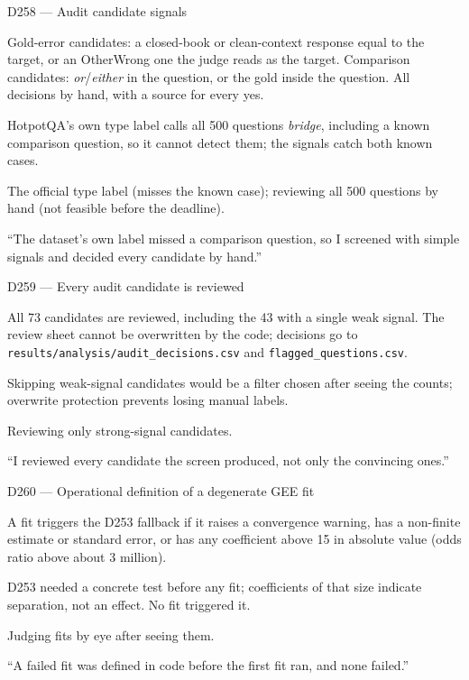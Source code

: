 \documentclass[11pt,a4paper]{report}
\begin{document}
\begin{decisionbox}{D258 --- Audit candidate signals}
\begin{description}[nosep, leftmargin=0pt]
  \item[Decision.] Gold-error candidates: a closed-book or clean-context response equal to the target, or an OtherWrong one the judge reads as the target. Comparison candidates: \emph{or}/\emph{either} in the question, or the gold inside the question. All decisions by hand, with a source for every yes.
  \item[Why.] HotpotQA's own type label calls all 500 questions \emph{bridge}, including a known comparison question, so it cannot detect them; the signals catch both known cases.
  \item[Alternatives.] The official type label (misses the known case); reviewing all 500 questions by hand (not feasible before the deadline).
  \item[Interview line.] ``The dataset's own label missed a comparison question, so I screened with simple signals and decided every candidate by hand.''
\end{description}
\end{decisionbox}

\begin{decisionbox}{D259 --- Every audit candidate is reviewed}
\begin{description}[nosep, leftmargin=0pt]
  \item[Decision.] All 73 candidates are reviewed, including the 43 with a single weak signal. The review sheet cannot be overwritten by the code; decisions go to \texttt{results/analysis/audit\_decisions.csv} and \texttt{flagged\_questions.csv}.
  \item[Why.] Skipping weak-signal candidates would be a filter chosen after seeing the counts; overwrite protection prevents losing manual labels.
  \item[Alternatives.] Reviewing only strong-signal candidates.
  \item[Interview line.] ``I reviewed every candidate the screen produced, not only the convincing ones.''
\end{description}
\end{decisionbox}
\begin{decisionbox}{D260 --- Operational definition of a degenerate GEE fit}
\begin{description}[nosep, leftmargin=0pt]
  \item[Decision.] A fit triggers the D253 fallback if it raises a convergence warning, has a non-finite estimate or standard error, or has any coefficient above 15 in absolute value (odds ratio above about 3 million).
  \item[Why.] D253 needed a concrete test before any fit; coefficients of that size indicate separation, not an effect. No fit triggered it.
  \item[Alternatives.] Judging fits by eye after seeing them.
  \item[Interview line.] ``A failed fit was defined in code before the first fit ran, and none failed.''
\end{description}
\end{decisionbox}
\end{document}

